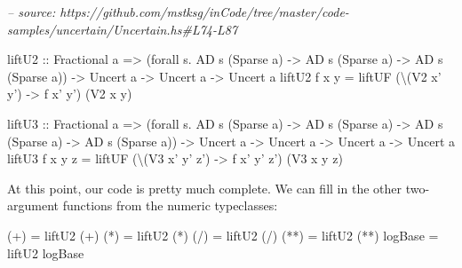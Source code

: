 \documentclass[]{article}
\newenvironment{Shaded}{}{}
\newcommand{\CommentTok}[1]{\textcolor[rgb]{0.38,0.63,0.69}{\textit{#1}}}
\newcommand{\DataTypeTok}[1]{\textcolor[rgb]{0.56,0.13,0.00}{#1}}
\newcommand{\FunctionTok}[1]{\textcolor[rgb]{0.02,0.16,0.49}{#1}}
\newcommand{\NormalTok}[1]{#1}
\newcommand{\OtherTok}[1]{\textcolor[rgb]{0.00,0.44,0.13}{#1}}
\begin{document}
\begin{Shaded}
\begin{Highlighting}[]
\CommentTok{-- source: https://github.com/mstksg/inCode/tree/master/code-samples/uncertain/Uncertain.hs#L74-L87}

\OtherTok{liftU2 ::} \DataTypeTok{Fractional}\NormalTok{ a}
       \OtherTok{=>}\NormalTok{ (forall s}\FunctionTok{.} \DataTypeTok{AD}\NormalTok{ s (}\DataTypeTok{Sparse}\NormalTok{ a) }\OtherTok{->} \DataTypeTok{AD}\NormalTok{ s (}\DataTypeTok{Sparse}\NormalTok{ a) }\OtherTok{->} \DataTypeTok{AD}\NormalTok{ s (}\DataTypeTok{Sparse}\NormalTok{ a))}
       \OtherTok{->} \DataTypeTok{Uncert}\NormalTok{ a}
       \OtherTok{->} \DataTypeTok{Uncert}\NormalTok{ a}
       \OtherTok{->} \DataTypeTok{Uncert}\NormalTok{ a}
\NormalTok{liftU2 f x y }\FunctionTok{=}\NormalTok{ liftUF (\textbackslash{}(}\DataTypeTok{V2}\NormalTok{ x' y') }\OtherTok{->}\NormalTok{ f x' y') (}\DataTypeTok{V2}\NormalTok{ x y)}

\OtherTok{liftU3 ::} \DataTypeTok{Fractional}\NormalTok{ a}
       \OtherTok{=>}\NormalTok{ (forall s}\FunctionTok{.} \DataTypeTok{AD}\NormalTok{ s (}\DataTypeTok{Sparse}\NormalTok{ a) }\OtherTok{->} \DataTypeTok{AD}\NormalTok{ s (}\DataTypeTok{Sparse}\NormalTok{ a) }\OtherTok{->} \DataTypeTok{AD}\NormalTok{ s (}\DataTypeTok{Sparse}\NormalTok{ a) }\OtherTok{->} \DataTypeTok{AD}\NormalTok{ s (}\DataTypeTok{Sparse}\NormalTok{ a))}
       \OtherTok{->} \DataTypeTok{Uncert}\NormalTok{ a}
       \OtherTok{->} \DataTypeTok{Uncert}\NormalTok{ a}
       \OtherTok{->} \DataTypeTok{Uncert}\NormalTok{ a}
       \OtherTok{->} \DataTypeTok{Uncert}\NormalTok{ a}
\NormalTok{liftU3 f x y z }\FunctionTok{=}\NormalTok{ liftUF (\textbackslash{}(}\DataTypeTok{V3}\NormalTok{ x' y' z') }\OtherTok{->}\NormalTok{ f x' y' z') (}\DataTypeTok{V3}\NormalTok{ x y z)}
\end{Highlighting}
\end{Shaded}

At this point, our code is pretty much complete. We can fill in the other
two-argument functions from the numeric typeclasses:

\begin{Shaded}
\begin{Highlighting}[]
\NormalTok{(}\FunctionTok{+}\NormalTok{)     }\FunctionTok{=}\NormalTok{ liftU2 (}\FunctionTok{+}\NormalTok{)}
\NormalTok{(}\FunctionTok{*}\NormalTok{)     }\FunctionTok{=}\NormalTok{ liftU2 (}\FunctionTok{*}\NormalTok{)}
\NormalTok{(}\FunctionTok{/}\NormalTok{)     }\FunctionTok{=}\NormalTok{ liftU2 (}\FunctionTok{/}\NormalTok{)}
\NormalTok{(}\FunctionTok{**}\NormalTok{)    }\FunctionTok{=}\NormalTok{ liftU2 (}\FunctionTok{**}\NormalTok{)}
\NormalTok{logBase }\FunctionTok{=}\NormalTok{ liftU2 logBase}
\end{Highlighting}
\end{Shaded}
\end{document}
